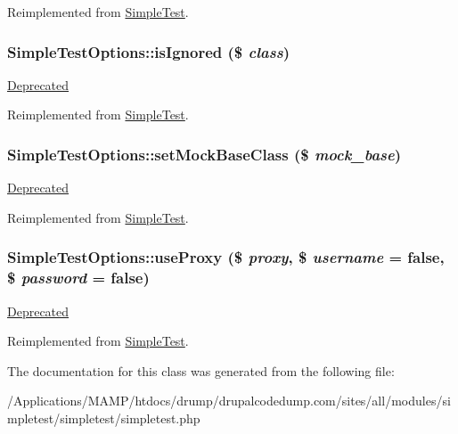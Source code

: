 Reimplemented from \hyperlink{class_simple_test_ad50fcd3215d2e5166c41bc73cef1bbe6}{SimpleTest}.\hypertarget{class_simple_test_options_a5a043e7e1dd2070601d53a5282f8787e}{
\subsubsection[{isIgnored}]{\setlength{\rightskip}{0pt plus 5cm}SimpleTestOptions::isIgnored (\$ {\em class})}}
\label{class_simple_test_options_a5a043e7e1dd2070601d53a5282f8787e}
\begin{Desc}
\item[\hyperlink{deprecated__deprecated000010}{Deprecated}]\end{Desc}


Reimplemented from \hyperlink{class_simple_test_a95bdcb7e0f83f70790ffc4566158824d}{SimpleTest}.\hypertarget{class_simple_test_options_abd99206b992d90ce1de9edbf4efceabb}{
\subsubsection[{setMockBaseClass}]{\setlength{\rightskip}{0pt plus 5cm}SimpleTestOptions::setMockBaseClass (\$ {\em mock\_\-base})}}
\label{class_simple_test_options_abd99206b992d90ce1de9edbf4efceabb}
\begin{Desc}
\item[\hyperlink{deprecated__deprecated000011}{Deprecated}]\end{Desc}


Reimplemented from \hyperlink{class_simple_test_a6bfdc0adde3e11f041872bbacd773fdf}{SimpleTest}.\hypertarget{class_simple_test_options_a6d722d3083d23b8ad3a59813aba88bb4}{
\subsubsection[{useProxy}]{\setlength{\rightskip}{0pt plus 5cm}SimpleTestOptions::useProxy (\$ {\em proxy}, \/  \$ {\em username} = {\ttfamily false}, \/  \$ {\em password} = {\ttfamily false})}}
\label{class_simple_test_options_a6d722d3083d23b8ad3a59813aba88bb4}
\begin{Desc}
\item[\hyperlink{deprecated__deprecated000013}{Deprecated}]\end{Desc}


Reimplemented from \hyperlink{class_simple_test_a40777a990732860c647bea8c7aa7f753}{SimpleTest}.

The documentation for this class was generated from the following file:\begin{DoxyCompactItemize}
\item 
/Applications/MAMP/htdocs/drump/drupalcodedump.com/sites/all/modules/simpletest/simpletest/simpletest.php\end{DoxyCompactItemize}
